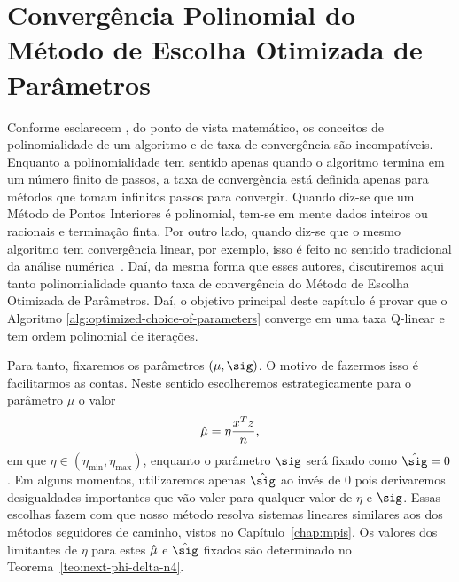 




\chapter{Convergência  Polinomial do Método de Escolha Otimizada de Parâmetros}


\label{chap:convergence}


Conforme esclarecem \textcite{Zhang:1993gn}, do ponto de vista matemático, os conceitos de polinomialidade de um algoritmo e de taxa de convergência são incompatíveis. Enquanto a polinomialidade tem sentido apenas quando o algoritmo termina em um número finito de passos, a taxa de convergência  está definida apenas para métodos que tomam infinitos passos para convergir. Quando diz-se que um Método de Pontos Interiores é polinomial, tem-se em mente dados inteiros ou racionais e terminação finta. Por outro lado, quando diz-se que o mesmo algoritmo tem convergência linear, por exemplo, isso é feito  no sentido tradicional da análise numérica~\cite{Ortega:2000vd}.
Daí, da mesma forma que esses autores, discutiremos aqui tanto polinomialidade quanto taxa de convergência do Método de Escolha Otimizada de Parâmetros. Daí, o objetivo principal  deste capítulo é   provar  que o Algoritmo \ref{alg:optimized-choice-of-parameters} converge em uma taxa Q-linear e tem ordem polinomial de iterações.






 Para tanto,  fixaremos os parâmetros $(\mu,\sig)$. O motivo de fazermos isso é facilitarmos as contas. Neste sentido escolheremos estrategicamente  para o parâmetro  $\mu$ o valor \[\hat{\mu}=\eta\dfrac{x^Tz}{n},
\] 
em que $\eta\in (\eta_{\min},\eta_{\max} )$, enquanto o parâmetro $\sig$ será fixado como $\nextsig =0 $. Em alguns momentos, utilizaremos apenas $\nextsig$ ao invés de $0$ pois derivaremos desigualdades importantes que vão valer para qualquer valor de $\eta$ e $\sig$. Essas escolhas  fazem com que nosso método resolva  sistemas lineares similares aos dos métodos seguidores de caminho, vistos no Capítulo~\ref{chap:mpis}. Os valores dos limitantes de $\eta$ para  estes $\hat{\mu}$  e $\nextsig$ fixados são determinado no Teorema~\ref{teo:next-phi-delta-n4}.


